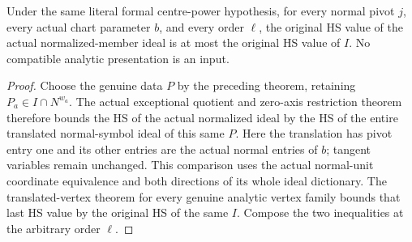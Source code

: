 \begin{theorem}
\label{hir:actual-reduced-centre-normalized-bennett}
\leanok
Under the same literal formal centre-power hypothesis, for every normal
pivot $j$, every actual chart parameter $b$, and every order $\ell$,
the original HS value of the actual normalized-member ideal is at most
the original HS value of $I$. No compatible analytic presentation is
an input.
\end{theorem}
\begin{proof}
Choose the genuine data $P$ by the preceding theorem, retaining
$P_a\in I\cap N^{w_a}$. The actual exceptional quotient and zero-axis
restriction theorem therefore bounds the HS of the actual normalized
ideal by the HS of the entire translated normal-symbol ideal of this
same $P$. Here the translation has pivot entry one and its other
entries are the actual normal entries of $b$; tangent variables remain
unchanged. This comparison uses the actual normal-unit coordinate
equivalence and both directions of its whole ideal dictionary. The
translated-vertex theorem for every genuine analytic vertex family
bounds that last HS value by the original HS of the same $I$. Compose
the two inequalities at the arbitrary order $\ell$.
\end{proof}

